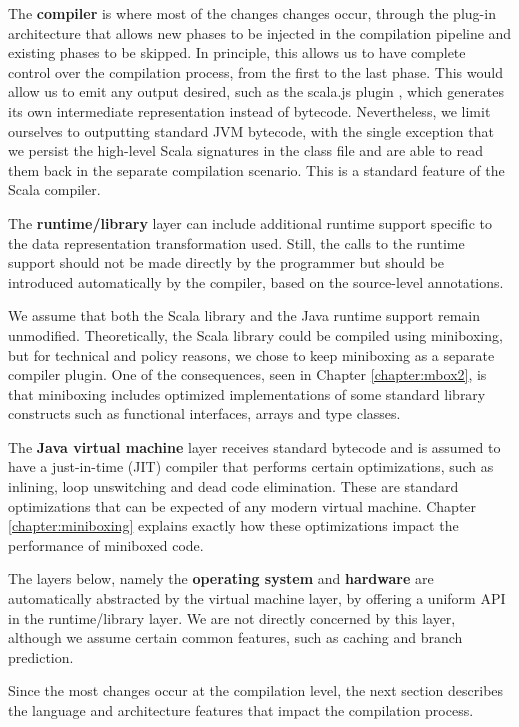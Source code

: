 The \textbf{compiler} is where most of the changes changes occur, through the plug-in architecture that allows new phases to be injected in the compilation pipeline and existing phases to be skipped. In principle, this allows us to have complete control over the compilation process, from the first to the last phase. This would allow us to emit any output desired, such as the scala.js plugin \cite{scala-js}, which generates its own intermediate representation instead of bytecode. Nevertheless, we limit ourselves to outputting standard JVM bytecode, with the single exception that we persist the high-level Scala signatures in the class file and are able to read them back in the separate compilation scenario. This is a standard feature of the Scala compiler.

The \textbf{runtime/library} layer can include additional runtime support specific to the data representation transformation used. Still, the calls to the runtime support should not be made directly by the programmer but should be introduced automatically by the compiler, based on the source-level annotations.

We assume that both the Scala library and the Java runtime support remain unmodified. Theoretically, the Scala library could be compiled using miniboxing, but for technical and policy reasons, we chose to keep miniboxing as a separate compiler plugin. One of the consequences, seen in Chapter \ref{chapter:mbox2}, is that miniboxing includes optimized implementations of some standard library constructs such as functional interfaces, arrays and type classes.

The \textbf{Java virtual machine} layer receives standard bytecode and is assumed to have a just-in-time (JIT) compiler that performs certain optimizations, such as inlining, loop unswitching and dead code elimination. These are standard optimizations that can be expected of any modern virtual machine. Chapter \ref{chapter:miniboxing} explains exactly how these optimizations impact the performance of miniboxed code.

The layers below, namely the \textbf{operating system} and \textbf{hardware} are automatically abstracted by the virtual machine layer, by offering a uniform API in the runtime/library layer. We are not directly concerned by this layer, although we assume certain common features, such as caching and branch prediction.

Since the most changes occur at the compilation level, the next section describes the language and architecture features that impact the compilation process.


